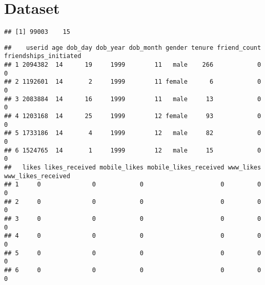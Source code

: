 \documentclass{article}
\begin{document}
\section{Dataset}
\begin{knitrout}
\color{fgcolor}\begin{kframe}
\begin{alltt}
 \hlkwb{<-} \hlstd{(} \hlstd{),}
                \hlstd{=} \hlstd{)}
\end{alltt}
\begin{verbatim}
## [1] 99003    15
\end{verbatim}
\begin{alltt}
\end{alltt}
\begin{verbatim}
##    userid age dob_day dob_year dob_month gender tenure friend_count friendships_initiated
## 1 2094382  14      19     1999        11   male    266            0                     0
## 2 1192601  14       2     1999        11 female      6            0                     0
## 3 2083884  14      16     1999        11   male     13            0                     0
## 4 1203168  14      25     1999        12 female     93            0                     0
## 5 1733186  14       4     1999        12   male     82            0                     0
## 6 1524765  14       1     1999        12   male     15            0                     0
##   likes likes_received mobile_likes mobile_likes_received www_likes www_likes_received
## 1     0              0            0                     0         0                  0
## 2     0              0            0                     0         0                  0
## 3     0              0            0                     0         0                  0
## 4     0              0            0                     0         0                  0
## 5     0              0            0                     0         0                  0
## 6     0              0            0                     0         0                  0
\end{verbatim}
\end{kframe}
\end{knitrout}
\end{document}
